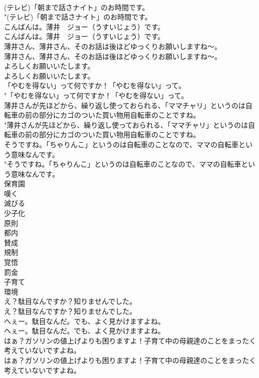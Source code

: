 \documentclass[8pt]{extreport}
\begin{document}
\begin{CJK}{UTF8}{min}
\\	(テレビ)「朝まで話さナイト」のお時間です。	
\\	"(テレビ)「朝まで話さナイト」のお時間です。 
\\	こんばんは。薄井　ジョー（うすいじょう）です。	
\\	こんばんは。薄井　ジョー（うすいじょう）です。 
\\	薄井さん、薄井さん、そのお話は後ほどゆっくりお願いしますね～。	
\\	薄井さん、薄井さん、そのお話は後ほどゆっくりお願いしますね～。 
\\	よろしくお願いいたします。	
\\	よろしくお願いいたします。 
\\	「やむを得ない」って何ですか！「やむを得ない」って。	
\\	"「やむを得ない」って何ですか！「やむを得ない」って。 
\\	薄井さんが先ほどから、繰り返し使っておられる、「ママチャリ」というのは自転車の前の部分にカゴのついた買い物用自転車のことですね。	
\\	"薄井さんが先ほどから、繰り返し使っておられる、「ママチャリ」というのは自転車の前の部分にカゴのついた買い物用自転車のことですね。 
\\	そうですね。「ちゃりんこ」というのは自転車のことなので、ママの自転車という意味なんです。	
\\	"そうですね。「ちゃりんこ」というのは自転車のことなので、ママの自転車という意味なんです。 
\\	保育園
\\	嘆く
\\	滅びる
\\	少子化
\\	原則
\\	都内
\\	賛成
\\	規制
\\	覚悟
\\	罰金
\\	子育て
\\	環境
\\	え？駄目なんですか？知りませんでした。	
\\	え？駄目なんですか？知りませんでした。 
\\	へぇー。駄目なんだ。でも、よく見かけますよね。	
\\	へぇー。駄目なんだ。でも、よく見かけますよね。 
\\	はぁ？ガソリンの値上げよりも困りますよ！子育て中の母親達のことをまったく考えていないですよね。	
\\	はぁ？ガソリンの値上げよりも困りますよ！子育て中の母親達のことをまったく考えていないですよね。 

\end{CJK}
\end{document}
